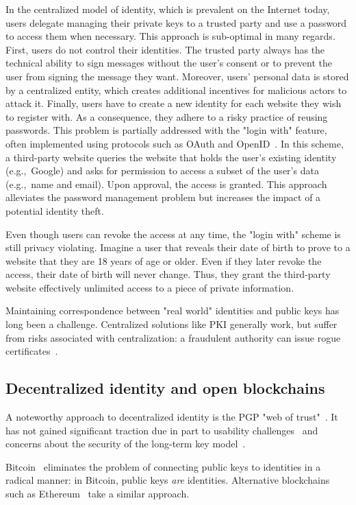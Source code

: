 In the centralized model of identity, which is prevalent on the Internet today, users delegate managing their private keys to a trusted party and use a password to access them when necessary.
This approach is sub-optimal in many regards.
First, users do not control their identities.
The trusted party always has the technical ability to sign messages without the user's consent or to prevent the user from signing the message they want.
Moreover, users' personal data is stored by a centralized entity, which creates additional incentives for malicious actors to attack it.
Finally, users have to create a new identity for each website they wish to register with.
As a consequence, they adhere to a risky practice of reusing passwords.
This problem is partially addressed with the "login with" feature, often implemented using protocols such as OAuth and OpenID~\cite{Dodanduwa2018}.
In this scheme, a third-party website queries the website that holds the user's existing identity (e.g.,~Google) and asks for permission to access a subset of the user's data (e.g.,~name and email).
Upon approval, the access is granted.
This approach alleviates the password management problem but increases the impact of a potential identity theft.

Even though users can revoke the access at any time, the "login with" scheme is still privacy violating.
Imagine a user that reveals their date of birth to prove to a website that they are 18 years of age or older.
Even if they later revoke the access, their date of birth will never change.
Thus, they grant the third-party website effectively unlimited access to a piece of private information.

Maintaining correspondence between "real world" identities and public keys has long been a challenge.
Centralized solutions like PKI generally work, but suffer from risks associated with centralization: a fraudulent authority can issue rogue certificates~\cite{Amann2017}.


\subsection{Decentralized identity and open blockchains}

A noteworthy approach to decentralized identity is the PGP "web of trust"~\cite{Feisthammel2017}.
It has not gained significant traction due in part to usability challenges~\cite{Ruoti2015} and concerns about the security of the long-term key model~\cite{Valsorda2016}.

Bitcoin~\cite{Nakamoto2008} eliminates the problem of connecting public keys to identities in a radical manner: in Bitcoin, public keys \textit{are} identities.
Alternative blockchains such as Ethereum~\cite{Buterin2014, Wood2014} take a similar approach.

